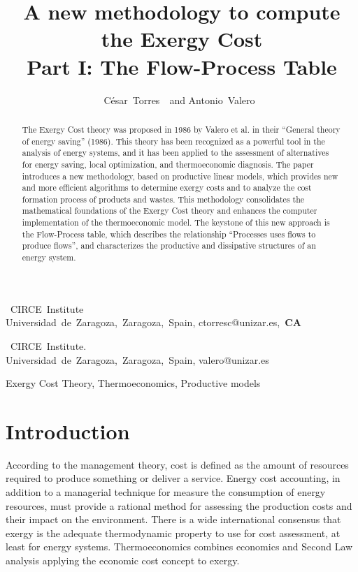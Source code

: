 \documentclass{ecos2018}
\title{A new methodology to compute the Exergy Cost\\ Part I: The Flow-Process Table}
\author{%
      \mbox{C\'esar Torres \refauth{a}}~and
      \mbox{Antonio Valero \refauth{b}}}
\begin{document}
\maketitle

\begin{address}
 \mbox{ CIRCE Institute} \\
 \mbox{Universidad de Zaragoza, Zaragoza, Spain,}
 \mbox{ctorresc@unizar.es, \textbf{CA}} \par
 \mbox{ CIRCE Institute.} \\
 \mbox{Universidad de Zaragoza, Zaragoza, Spain,}
 \mbox{valero@unizar.es} \par
\end{address}

\begin{abstract}%
\begin{spacing}{1.1}
The Exergy Cost theory was proposed in 1986 by Valero et al. in their “General theory of energy saving” (1986). This theory has been recognized as a powerful tool in the analysis of energy systems, and it has been applied to the assessment of alternatives for energy saving, local optimization, and thermoeconomic diagnosis.
The paper introduces a new methodology, based on productive linear models, which provides new and more efficient algorithms to determine exergy costs and to analyze the cost formation process of products and wastes. This methodology consolidates the mathematical foundations of the Exergy Cost theory and enhances the computer implementation of the thermoeconomic  model.
The keystone of this new approach is the Flow-Process table, which describes the  relationship “Processes uses flows to produce flows”, and characterizes the productive and dissipative structures of an energy system.
\end{spacing}
\end{abstract}

\begin{keywords}
Exergy Cost Theory, Thermoeconomics, Productive models
\end{keywords}

\section{Introduction}
According to the management theory, cost is defined as the amount of resources required to produce something or deliver a service. Energy cost accounting, in addition to a managerial technique for measure the consumption of energy resources, must provide a rational method for assessing the production costs and their impact on the environment.
There is a wide international consensus that exergy is the adequate thermodynamic property to use for cost assessment, at least for energy systems. Thermoeconomics combines economics and Second Law analysis applying the economic cost concept to exergy.
\end{document}
